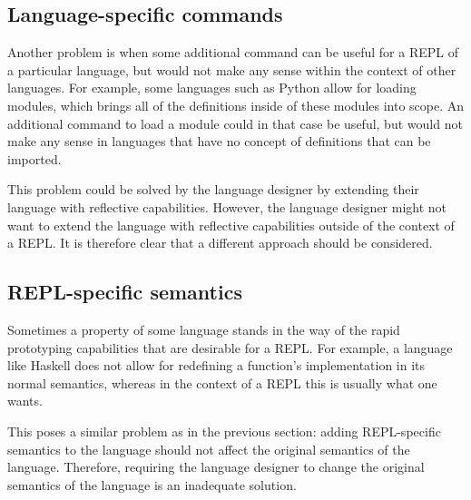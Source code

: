 \subsection{Language-specific commands}
\label{ssec:lang-spec-addit}
Another problem is when some additional command can be useful for a
REPL of a particular language, but would not make any sense within the
context of other languages. For example, some languages such as Python
allow for loading modules, which brings all of the definitions inside
of these modules into scope. An additional command to load a module
could in that case be useful, but would not make any sense in
languages that have no concept of definitions that can be imported.

This problem could be solved by the language designer by extending
their language with reflective capabilities. However, the language
designer might not want to extend the language with reflective
capabilities outside of the context of a REPL. It is therefore clear
that a different approach should be considered.

\subsection{REPL-specific semantics}
\label{ssec:repl-spec-semant}
Sometimes a property of some language stands in the way of the rapid
prototyping capabilities that are desirable for a REPL. For example, a
language like Haskell does not allow for redefining a function's
implementation in its normal semantics, whereas in the context of a
REPL this is usually what one wants.

This poses a similar problem as in the previous section: adding REPL-specific
semantics to the language should not affect the original semantics of the
language. Therefore, requiring the language designer to change the original
semantics of the language is an inadequate solution.


